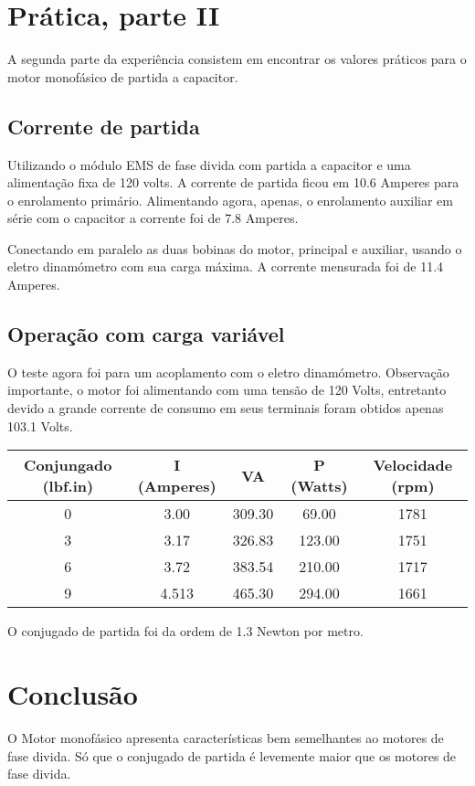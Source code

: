 \documentclass[paper=a4, fontsize=11pt]{article}
\begin{document}
\section{Prática, parte II}

A segunda parte da experiência consistem em encontrar
os valores práticos para o motor monofásico de partida a capacitor.

\subsection{Corrente de partida}

Utilizando o módulo EMS de fase divida com partida a capacitor
e uma alimentação fixa de 120 volts. A corrente de partida
ficou em 10.6 Amperes para o enrolamento primário. Alimentando
agora, apenas, o enrolamento auxiliar em série com
o capacitor a corrente foi de 7.8 Amperes.

Conectando em paralelo as duas bobinas do motor, principal e 
auxiliar, usando o eletro dinamómetro com sua carga máxima. A
corrente mensurada foi de 11.4 Amperes.

\subsection{Operação com carga variável}

O teste agora foi para um acoplamento com o eletro dinamómetro.
Observação importante, o motor foi alimentando com uma tensão 
de 120 Volts, entretanto devido a grande corrente de consumo
em seus terminais foram obtidos apenas 103.1 Volts.

\begin{center}
    \begin{tabular}{c|c|c|c|c}
            Conjungado (lbf.in) & I (Amperes) & VA & P (Watts) & Velocidade (rpm) \\
            \hline
            0 & 3.00 & 309.30 & 69.00 & 1781 \\
            3 & 3.17 & 326.83 & 123.00 & 1751 \\
            6 & 3.72 & 383.54 & 210.00 & 1717 \\
            9 & 4.513 & 465.30 & 294.00 & 1661 \\
    \end{tabular}
\end{center}

O conjugado de partida foi da ordem de 1.3 Newton por metro.

\section{Conclusão}

O Motor monofásico apresenta características bem semelhantes
ao motores de fase divida. Só que o conjugado de partida é levemente
maior que os motores de fase divida. 
\end{document}
